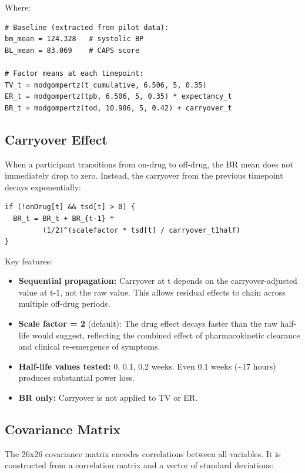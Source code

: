 \documentclass[11pt]{article}
\begin{document}
Where:

\begin{lstlisting}
# Baseline (extracted from pilot data):
bm_mean = 124.328   # systolic BP
BL_mean = 83.069    # CAPS score

# Factor means at each timepoint:
TV_t = modgompertz(t_cumulative, 6.506, 5, 0.35)
ER_t = modgompertz(tpb, 6.506, 5, 0.35) * expectancy_t
BR_t = modgompertz(tod, 10.986, 5, 0.42) + carryover_t
\end{lstlisting}

\subsection{Carryover Effect}

When a participant transitions from on-drug to off-drug, the BR
mean does not immediately drop to zero. Instead, the carryover
from the previous timepoint decays exponentially:

\begin{lstlisting}
if (!onDrug[t] && tsd[t] > 0) {
  BR_t = BR_t + BR_{t-1} *
         (1/2)^(scalefactor * tsd[t] / carryover_t1half)
}
\end{lstlisting}

Key features:

\begin{itemize}
  \item \textbf{Sequential propagation:} Carryover at t depends on the
    carryover-adjusted value at t-1, not the raw value. This
    allows residual effects to chain across multiple off-drug
    periods.
  \item \textbf{Scale factor = 2} (default): The drug effect decays faster
    than the raw half-life would suggest, reflecting the combined
    effect of pharmacokinetic clearance and clinical re-emergence
    of symptoms.
  \item \textbf{Half-life values tested:} 0, 0.1, 0.2 weeks. Even 0.1 weeks
    (\textasciitilde 17 hours) produces substantial power loss.
  \item \textbf{BR only:} Carryover is not applied to TV or ER.
\end{itemize}

\subsection{Covariance Matrix}

The 26x26 covariance matrix encodes correlations between all
variables. It is constructed from a correlation matrix and a
vector of standard deviations:
\end{document}
